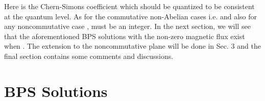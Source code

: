 \documentclass[a4paper,12pt]{article}
\begin{document}
Here \myHighlight{$\kappa$}\coordHE{} is the Chern-Simons coefficient which should be quantized to be
consistent at the quantum level. As for the commutative non-Abelian cases i.e. \coordHE{} and also for  any
noncommutative case \cite{0102188},   \myHighlight{$2\pi\kappa$}\coordHE{} must be an integer. In the next section, we will see that the
aforementioned BPS solutions with the non-zero magnetic flux exist when
\coordHE{}. The extension to the noncommutative plane will be
done in Sec. 3 and the final section contains some comments and discussions.




\section{BPS Solutions}
\end{document}
